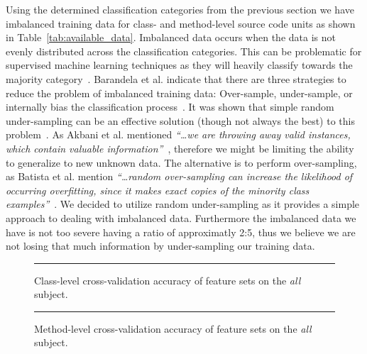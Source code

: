 \noindent
Using the determined classification categories from the previous section we have imbalanced training data for class- and method-level source code units as shown in Table~\ref{tab:available_data}. Imbalanced data occurs when the data is not evenly distributed across the classification categories. This can be problematic for supervised machine learning techniques as they will heavily classify towards the majority category~\cite{BOSB10}. Barandela et al. indicate that there are three strategies to reduce the problem of imbalanced training data: Over-sample, under-sample, or internally bias the classification process~\cite{BVSF04}. It was shown that simple random under-sampling can be an effective solution (though not always the best) to this problem~\cite{Jap00,AKJ04}. As Akbani et al. mentioned \emph{``\ldots we are throwing away valid instances, which contain valuable information''}~\cite{AKJ04}, therefore we might be limiting the ability to generalize to new unknown data. The alternative is to perform over-sampling, as Batista et al. mention \emph{``\ldots random over-sampling can increase the likelihood of occurring overfitting, since it makes exact copies of the minority class examples''}~\cite{BPM04}. We decided to utilize random under-sampling as it provides a simple approach to dealing with imbalanced data. Furthermore the imbalanced data we have is not too severe having a ratio of approximatly 2:5, thus we believe we are not losing that much information by under-sampling our training data.

\begin{figure}[!ht]
  \centering
  \begin{adjustbox}{max size={.95\textwidth}{.95\textheight}}
    
  \end{adjustbox}
  \caption{Class-level cross-validation accuracy of feature sets on the \emph{all} subject.}
  \vspace{2mm}
  \hrule
  \label{fig:all_cross_validation_features_class_graph}
\end{figure}

\begin{figure}[!ht]
  \centering
  \begin{adjustbox}{max size={.95\textwidth}{.95\textheight}}
    
  \end{adjustbox}
  \caption{Method-level cross-validation accuracy of feature sets on the \emph{all} subject.}
  \vspace{2mm}
  \hrule
  \label{fig:all_cross_validation_features_method_graph}
\end{figure}

